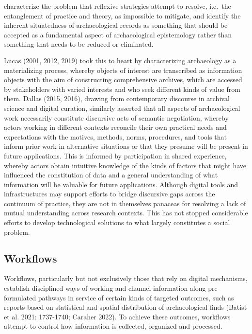 \documentclass[
]{article}
\providecommand{\DIFadd}[1]{{\protect\color{blue}\uwave{#1}}} %
\providecommand{\DIFaddend}{} %
\providecommand{\DIFdelbegin}{} %
\providecommand{\DIFdelend}{} %
\newcommand{\DIFscaledelfig}{0.5}
\newlength{\DIFdelgraphicswidth} %
\newlength{\DIFdelgraphicsheight} %
\newcommand{\DIFdelincludegraphics}[2][]{%
\sbox{\DIFdelgraphicsbox}{\DIFOincludegraphics[#1]{#2}}%
\settoboxwidth{\DIFdelgraphicswidth}{\DIFdelgraphicsbox} %
\settoboxtotalheight{\DIFdelgraphicsheight}{\DIFdelgraphicsbox} %
\scalebox{\DIFscaledelfig}{%
\parbox[b]{\DIFdelgraphicswidth}{\usebox{\DIFdelgraphicsbox}\\[-\baselineskip] \rule{\DIFdelgraphicswidth}{0em}}\llap{\resizebox{\DIFdelgraphicswidth}{\DIFdelgraphicsheight}{%
\setlength{\unitlength}{\DIFdelgraphicswidth}%
\begin{picture}(1,1)%
\thicklines\linethickness{2pt} %
{\color[rgb]{1,0,0}\put(0,0){\framebox(1,1){}}}%
{\color[rgb]{1,0,0}\put(0,0){\line( 1,1){1}}}%
{\color[rgb]{1,0,0}\put(0,1){\line(1,-1){1}}}%
\end{picture}%
}\hspace*{3pt}}} %
} %
\DeclareRobustCommand{\DIFaddend}{\DIFOaddend \let\includegraphics\DIFOincludegraphics} %
\DeclareRobustCommand{\DIFdelbegin}{\DIFOdelbegin \let\includegraphics\DIFdelincludegraphics} %
\DeclareRobustCommand{\DIFdelend}{\DIFOaddend \let\includegraphics\DIFOincludegraphics} %
\begin{document}
\DIFadd{Moreover, these critiques }\DIFaddend characterize the problem that reflexive
strategies attempt to resolve, i.e.~the entanglement of practice and
theory, as impossible to mitigate, and identify the inherent
situatedness of archaeological records as something that should be
accepted as a fundamental aspect of archaeological epistemology rather
than something that needs to be reduced or eliminated. \DIFdelbegin %

\DIFdelend Lucas (2001,
2012, 2019) took this to heart by characterizing archaeology as a
materializing process, whereby objects of interest are transcribed as
information objects with the aim of constructing comprehensive archives,
which are accessed by stakeholders with varied interests and who seek
different kinds of value from them. Dallas (2015, 2016), drawing from
contemporary discourse in archival science and digital curation,
similarly asserted that all aspects of archaeological work necessarily
constitute discursive acts of semantic negotiation, whereby actors
working in different contexts reconcile their own practical needs and
expectations with the motives, methods, norms, procedures, and tools
that inform prior work in alternative situations or that they presume
will be present in future applications. This is informed by
participation in shared experience, whereby actors obtain intuitive
knowledge of the kinds of factors that might have influenced the
constitution of data and a general understanding of what information
will be valuable for future applications. Although digital tools and
infrastructures may support efforts to bridge discursive gaps across the
continuum of practice, they are not in themselves panaceas for resolving
a lack of mutual understanding across research contexts. This has not
stopped considerable efforts to develop technological solutions to what
largely constitutes a social problem.

\subsection{Workflows}\label{workflows}

Workflows, particularly but not exclusively those that rely on digital
mechanisms, establish disciplined ways of working and channel
information along pre-formulated pathways in service of certain kinds of
targeted outcomes, such as reports based on statistical and spatial
distribution of archaeological finds (Batist et al. 2021: 1737-1740;
Caraher 2022). To achieve these outcomes, workflows attempt to control
how information is collected, organized and processed.
\end{document}

